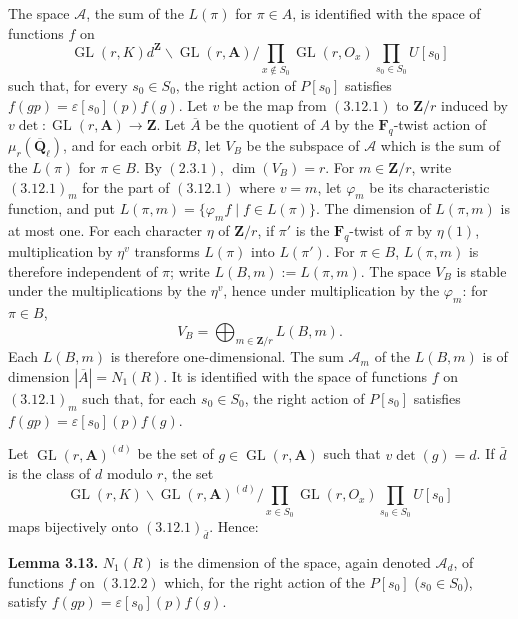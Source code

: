 \documentclass[11pt]{article}
\newcommand{\Qbar}{\overline{\mathbf Q}}
\newcommand{\Fq}{\mathbf F_q}
\newcommand{\Z}{\mathbf Z}
\newcommand{\A}{\mathbf A}
\newcommand{\GL}{\operatorname{GL}}
\begin{document}
The space \(\mathcal A\), the sum of the \(L(\pi)\) for \(\pi\in A\), is identified with the space of functions \(f\) on
\begin{equation}\tag{3.12.1}
\GL(r,K)d^\Z\backslash\GL(r,\A)/\prod_{x\notin S_0}\GL(r,O_x)\prod_{s_0\in S_0}U[s_0]
\end{equation}
such that, for every \(s_0\in S_0\), the right action of \(P[s_0]\) satisfies \(f(gp)=\varepsilon[s_0](p)f(g)\). Let \(v\) be the map from \((3.12.1)\) to \(\Z/r\) induced by \(v\det:\GL(r,\A)\to\Z\). Let \(\overline A\) be the quotient of \(A\) by the \(\Fq\)-twist action of \(\mu_r(\Qbar_\ell)\), and for each orbit \(B\), let \(V_B\) be the subspace of \(\mathcal A\) which is the sum of the \(L(\pi)\) for \(\pi\in B\). By \((2.3.1)\), \(\dim(V_B)=r\). For \(m\in\Z/r\), write \((3.12.1)_m\) for the part of \((3.12.1)\) where \(v=m\), let \(\varphi_m\) be its characteristic function, and put \(L(\pi,m)=\{\varphi_m f\mid f\in L(\pi)\}\). The dimension of \(L(\pi,m)\) is at most one. For each character \(\eta\) of \(\Z/r\), if \(\pi'\) is the \(\Fq\)-twist of \(\pi\) by \(\eta(1)\), multiplication by \(\eta^v\) transforms \(L(\pi)\) into \(L(\pi')\). For \(\pi\in B\), \(L(\pi,m)\) is therefore independent of \(\pi\); write \(L(B,m):=L(\pi,m)\). The space \(V_B\) is stable under the multiplications by the \(\eta^v\), hence under multiplication by the \(\varphi_m\): for \(\pi\in B\),
\[
V_B=\bigoplus_{m\in\Z/r}L(B,m).
\]
Each \(L(B,m)\) is therefore one-dimensional. The sum \(\mathcal A_m\) of the \(L(B,m)\) is of dimension \(|\overline A|=N_1(R)\). It is identified with the space of functions \(f\) on \((3.12.1)_m\) such that, for each \(s_0\in S_0\), the right action of \(P[s_0]\) satisfies \(f(gp)=\varepsilon[s_0](p)f(g)\).

Let \(\GL(r,\A)^{(d)}\) be the set of \(g\in\GL(r,\A)\) such that \(v\det(g)=d\). If \(\bar d\) is the class of \(d\) modulo \(r\), the set
\begin{equation}\tag{3.12.2}
\GL(r,K)\backslash\GL(r,\A)^{(d)}/\prod_{x\in S_0}\GL(r,O_x)\prod_{s_0\in S_0}U[s_0]
\end{equation}
maps bijectively onto \((3.12.1)_{\bar d}\). Hence:

\textbf{Lemma 3.13.} \(N_1(R)\) is the dimension of the space, again denoted \(\mathcal A_d\), of functions \(f\) on \((3.12.2)\) which, for the right action of the \(P[s_0]\) (\(s_0\in S_0\)), satisfy \(f(gp)=\varepsilon[s_0](p)f(g)\).
\end{document}
